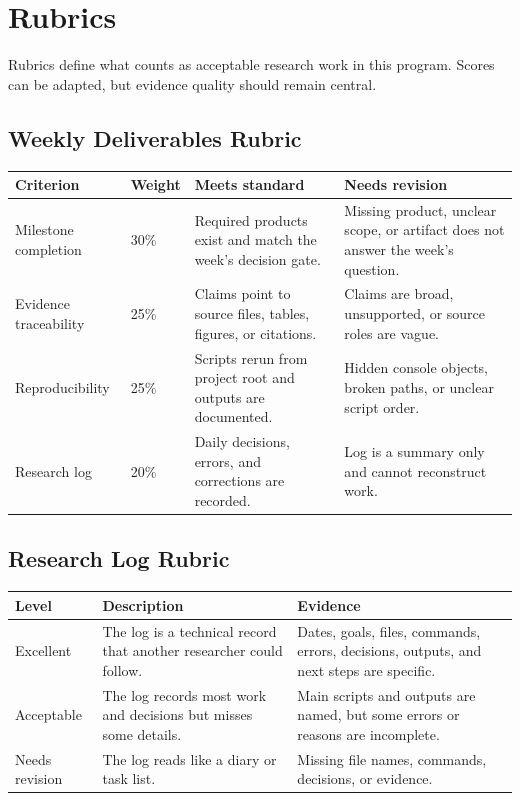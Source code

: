 \chapter{Rubrics}

Rubrics define what counts as acceptable research work in this program. Scores can be adapted, but evidence quality should remain central.

\section{Weekly Deliverables Rubric}
\begin{longtable}{p{}p{}p{}p{}}
\toprule
\textbf{Criterion} & \textbf{Weight} & \textbf{Meets standard} & \textbf{Needs revision} \\
\midrule
Milestone completion & 30\% & Required products exist and match the week's decision gate. & Missing product, unclear scope, or artifact does not answer the week's question. \\
Evidence traceability & 25\% & Claims point to source files, tables, figures, or citations. & Claims are broad, unsupported, or source roles are vague. \\
Reproducibility & 25\% & Scripts rerun from project root and outputs are documented. & Hidden console objects, broken paths, or unclear script order. \\
Research log & 20\% & Daily decisions, errors, and corrections are recorded. & Log is a summary only and cannot reconstruct work. \\
\bottomrule
\end{longtable}

\section{Research Log Rubric}
\begin{longtable}{p{}p{}p{}}
\toprule
\textbf{Level} & \textbf{Description} & \textbf{Evidence} \\
\midrule
Excellent & The log is a technical record that another researcher could follow. & Dates, goals, files, commands, errors, decisions, outputs, and next steps are specific. \\
Acceptable & The log records most work and decisions but misses some details. & Main scripts and outputs are named, but some errors or reasons are incomplete. \\
Needs revision & The log reads like a diary or task list. & Missing file names, commands, decisions, or evidence. \\
\bottomrule
\end{longtable}

